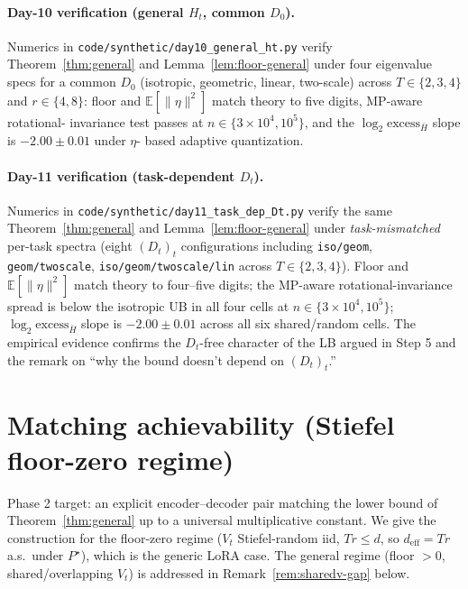 \documentclass{article}
\theoremstyle{remark}
\newcommand{\E}{\mathbb{E}}
\newcommand{\deff}{d_{\mathrm{eff}}}
\begin{document}
\paragraph{Day-10 verification (general $H_t$, common $D_0$).}
Numerics in \texttt{code/synthetic/day10\_general\_ht.py} verify
Theorem~\ref{thm:general} and Lemma~\ref{lem:floor-general} under four
eigenvalue specs for a common $D_0$ (isotropic, geometric, linear,
two-scale) across $T\in\{2,3,4\}$ and $r\in\{4,8\}$: floor and
$\E[\|\eta\|^2]$ match theory to five digits, MP-aware rotational-
invariance test passes at $n \in \{3\times 10^4, 10^5\}$, and the
$\log_2\text{excess}_{\bar H}$ slope is $-2.00\pm 0.01$ under $\eta$-
based adaptive quantization.

\paragraph{Day-11 verification (task-dependent $D_t$).} Numerics in
\texttt{code/synthetic/day11\_task\_dep\_Dt.py} verify the same
Theorem~\ref{thm:general} and Lemma~\ref{lem:floor-general} under
\emph{task-mismatched} per-task spectra (eight $(D_t)_t$
configurations including \texttt{iso/geom}, \texttt{geom/twoscale},
\texttt{iso/geom/twoscale/lin} across $T\in\{2,3,4\}$). Floor and
$\E[\|\eta\|^2]$ match theory to four--five digits; the MP-aware
rotational-invariance spread is below the isotropic UB in all four
cells at $n\in\{3\times 10^4, 10^5\}$; $\log_2\text{excess}_{\bar H}$
slope is $-2.00\pm 0.01$ across all six shared/random cells. The
empirical evidence confirms the $D_t$-free character of the LB
argued in Step 5 and the remark on ``why the bound doesn't depend
on $(D_t)_t$.''

\section{Matching achievability (Stiefel floor-zero regime)}\label{sec:achv}

Phase 2 target: an explicit encoder--decoder pair matching the lower
bound of Theorem~\ref{thm:general} up to a universal multiplicative
constant. We give the construction for the floor-zero regime
($V_t$ Stiefel-random iid, $Tr\leq d$, so $\deff=Tr$ a.s.\ under
$P^\star$), which is the generic LoRA case. The general regime
(floor $>0$, shared/overlapping $V_t$) is addressed in
Remark~\ref{rem:sharedv-gap} below.
\end{document}
